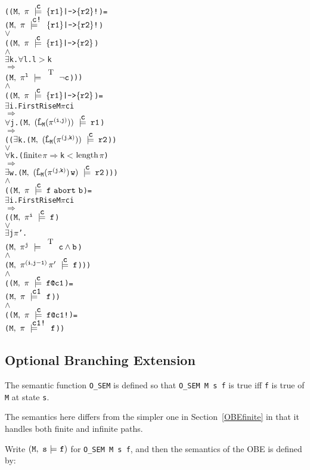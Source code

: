 \documentclass{llncs}
\makeatletter
\newcommand{\And}{\(\wedge\)}
\newcommand{\Or}{\(\vee\)}
\newcommand{\Imp}{\(\Rightarrow\)}
\newcommand{\Forall}{\(\forall\)}
\newcommand{\Exists}{\(\exists\)}
\newcommand{\IsFinitePath}{\({\rm{finite}}\)}
\newcommand{\PathLength}{\({\rm{length}}\)}
\newcommand{\cat}{\hspace*{0.5mm}}
\newcommand{\pathCat}[2]{#1\hspace*{0.5mm}#2}
\newcommand{\Le}{\(<\)}
\newcommand{\Ge}{\(>\)}
\newcommand{\T}{\texttt{\small\rm{T}}}
\renewcommand{\Pi}{\(\pi\)}
\newcommand{\SSem}[4]{(\(\tt{#1,~#2~\models^{\hspace*{-2.3mm}\raisebox{1mm}{\tt#3}}~#4}\))}
\newcommand{\FSem}[4]{(\(\tt{#1,~#2~\models^{\hspace*{-2.3mm}\raisebox{1mm}{\tt#3}}~#4}\))}
\newcommand{\Osem}{\texttt{O\_SEM}\xspace}
\newcommand{\oSem}[3]{(\tt{#1,~#2~{\models}~#3})}
\newcommand{\FBool}[1]{#1}
\newcommand{\bNot}[1]{\neg#1}
\newcommand{\weakClock}[1]{#1}
\newcommand{\strongClock}[1]{#1!}
\newcommand{\restN}[2]{#1^{#2}}
\newcommand{\pathSeg}[2]{#1^{#2}}
\newcommand{\lHat}[1]{\hat{\texttt{L}}_{#1}}
\newcommand{\bAnd}[2]{#1\wedge#2}
\newcommand{\fStrongImp}[2]{\{#1\}\texttt{|->}\{#2\}\texttt{!}}
\newcommand{\fWeakImp}[2]{\{#1\}\texttt{|->}\{#2\}}
\newcommand{\fAbort}[2]{#1~\texttt{abort}~#2}
\newcommand{\fWeakClock}[2]{#1\texttt{@}#2}
\newcommand{\fStrongClock}[2]{#1\texttt{@}#2\texttt{!}}
\makeatother
\begin{document}
{\begin{alltt}
    ({\FSem{M}{{\pi}}{{\weakClock{c}}}{\fStrongImp{r1}{r2}}} = 
      {\FSem{M}{{\pi}}{{\strongClock{c}}}{\fStrongImp{r1}{r2}}}  
      {\Or}
      ({\FSem{M}{{\pi}}{{\weakClock{c}}}{\fWeakImp{r1}{r2}}} 
       {\And}
       {\Exists}k. {\Forall}l. l {\Ge} k 
               {\Imp} 
               {\FSem{M}{\restN{{\pi}}{l}}{\weakClock{\T}}{{\FBool{\bNot{c}}}}}))
    {\And}
    ({\FSem{M}{{\pi}}{{\weakClock{c}}}{\fWeakImp{r1}{r2}}} = 
      {\Exists}i.  FirstRise M {\Pi} c i
           {\Imp}
           {\Forall}j. \SSem{M}{(\lHat{M} (\pathSeg{\pi}{(i,j)}))}{c}{r1}
               {\Imp}
               (({\Exists}k. \SSem{M}{ (\lHat{M} (\pathSeg{\pi}{(j,k)}))}{c}{r2})
                {\Or}
                {\Forall}k. ({\IsFinitePath} {\Pi} {\Imp} k {\Le} \PathLength {\Pi})
                    {\Imp}
                    {\Exists}w. \SSem{M}{(\lHat{M} (\pathSeg{\pi}{(j,k)}){\cat}w)}{c}{r2}))
    {\And}
    ({\FSem{M}{{\pi}}{{\weakClock{c}}}{\fAbort{f}{b}}} =
      {\Exists}i. FirstRise M {\Pi} c i 
          {\Imp}
          ({\FSem{M}{\restN{{\pi}}{i}}{{\weakClock{c}}}{f}} 
           {\Or}   
           {\Exists}j {\Pi}'. 
            {\FSem{M}{\restN{{\pi}}{j}}{\weakClock{\T}}{{\FBool{\bAnd{c}{b}}}}}
            {\And}
            {\FSem{M}{\pathCat{\pathSeg{\pi}{(i,j-1)}}{{\pi}'}}{{\weakClock{c}}}{f}}))
    {\And}
    ({\FSem{M}{{\pi}}{{\weakClock{c}}}{\fWeakClock{f}{c1}}} =   
      {\FSem{M}{{\pi}}{{\weakClock{c1}}}{f}})
    {\And}
    ({\FSem{M}{{\pi}}{{\weakClock{c}}}{\fStrongClock{f}{c1}}} =   
      {\FSem{M}{{\pi}}{{\strongClock{c1}}}{f}})
\end{alltt}}

\subsection{Optional Branching Extension}\label{OBE}


The semantic function \Osem is defined so that
\texttt{\Osem~M~s~f} is true iff \texttt{f} is true of \texttt{M} at
state \texttt{s}.

The semantics here differs from the simpler one in Section~\ref{OBEfinite}
in that it handles both finite and infinite paths.

Write $\oSem{M}{s}{f}$ for \texttt{\Osem~M~s~f}, and then the semantics of the OBE is defined by:
\end{document}
